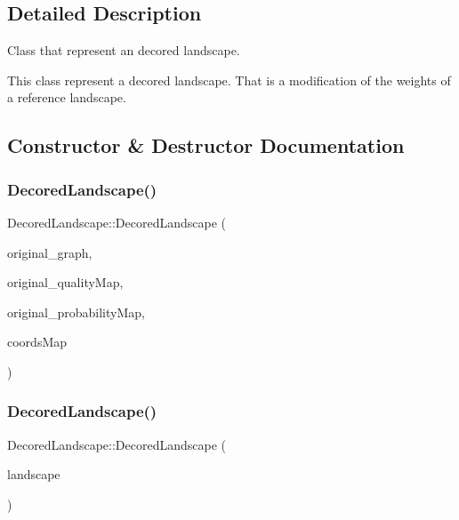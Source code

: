 \subsection{Detailed Description}
Class that represent an decored landscape. 

This class represent a decored landscape. That is a modification of the weights of a reference landscape. 

\subsection{Constructor \& Destructor Documentation}
\mbox{\label{class_decored_landscape_ae7ba2eb4a09b153b238f22fcb33b5260}} 
\subsubsection{\texorpdfstring{Decored\+Landscape()}{DecoredLandscape()}\hspace{0.1cm}{\footnotesize\ttfamily [1/2]}}
{\footnotesize\ttfamily Decored\+Landscape\+::\+Decored\+Landscape (\begin{DoxyParamCaption}\item[{const \hyperlink{pl__reff_8cpp_a65aea14f39d53b24df9910d54216d620}{Graph\+\_\+t} \&}]{original\+\_\+graph,  }\item[{const Graph\+\_\+t\+::\+Node\+Map$<$ double $>$ \&}]{original\+\_\+quality\+Map,  }\item[{const Graph\+\_\+t\+::\+Arc\+Map$<$ double $>$ \&}]{original\+\_\+probability\+Map,  }\item[{const \hyperlink{classconcepts_1_1_abstract_landscape_a8432d7dff7edc5a5cbc524592b411f8a}{Coords\+Map} \&}]{coords\+Map }\end{DoxyParamCaption})}

\mbox{\label{class_decored_landscape_a501bfb6656d735d8a564ea4c0aa6ccfd}} 
\subsubsection{\texorpdfstring{Decored\+Landscape()}{DecoredLandscape()}\hspace{0.1cm}{\footnotesize\ttfamily [2/2]}}
{\footnotesize\ttfamily Decored\+Landscape\+::\+Decored\+Landscape (\begin{DoxyParamCaption}\item[{const \hyperlink{class_landscape}{Landscape} \&}]{landscape }\end{DoxyParamCaption})}

